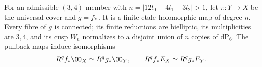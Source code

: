 
\begin{proposition}\hypertarget{tag-01S7}{}\label{inv:B3.1}

For an admissible $(3,4)$ member with
$n=|12l_0-4l_1-3l_2|>1$, let $\pi:Y\to X$ be the universal
cover and $g=f\pi$. It is a finite etale holomorphic map of degree $n$.
Every fibre of $g$ is connected; its finite reductions are bielliptic,
its multiplicities are $3,4$, and its cusp $W_n$ normalizes to a
disjoint union of $n$ copies of $\mathrm{dP}_6$.
The pullback maps induce isomorphisms
\[
R^qf_*\OO_X\simeq R^qg_*\OO_Y,\qquad
R^qf_*E_X\simeq R^qg_*E_Y.
\]
\end{proposition}


